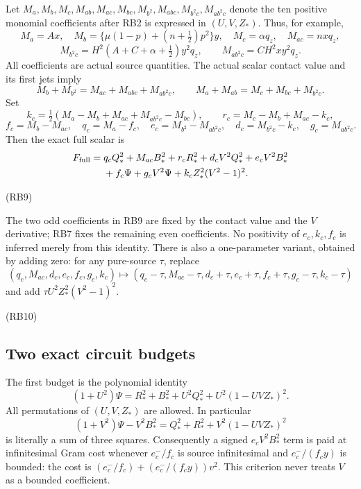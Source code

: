 Let $M_a,M_b,M_c,M_{ab},M_{ac},M_{bc},M_{b^2},
M_{abc},M_{b^2c},M_{ab^2c}$ denote the ten positive monomial
coefficients after RB2 is expressed in $(U,V,Z_*)$. Thus, for example,
\[
 M_a=Ax,\quad M_b=\{\mu(1-p)+(n+\tfrac12)p^2\}y,\quad
 M_c=\alpha q_z,\quad M_{ac}=nxq_z,
\]
\[
 M_{b^2c}=H^2(A+C+\alpha+\tfrac12)y^2q_z,\qquad
 M_{ab^2c}=CH^2xy^2q_z.
\tag{RB6}
\]
All coefficients are actual source quantities.
The actual scalar contact value and its first jets imply
\[
 M_b+M_{b^2}=M_{ac}+M_{abc}+M_{ab^2c},\qquad
 M_a+M_{ab}=M_c+M_{bc}+M_{b^2c}.
\tag{RB7}
\]
Set
\[
 k_c=\tfrac12(M_a-M_b+M_{ac}+M_{ab^2c}-M_{bc}),\qquad
 r_c=M_c-M_b+M_{ac}-k_c,
\]
\[
 f_c=M_b-M_{ac},\quad q_c=M_a-f_c,\quad
 e_c=M_{b^2}-M_{ab^2c},\quad d_c=M_{b^2c}-k_c,\quad
 g_c=M_{ab^2c}.
\tag{RB8}
\]
Then the exact full scalar is
\begin{align*}
F_{\rm full}={}&q_cQ_*^2+M_{ac}B_*^2+r_cR_*^2
 +d_cV^2Q_*^2+e_cV^2B_*^2\\
&+f_c\Psi+g_cV^2\Psi
 +k_cZ_*^2(V^2-1)^2 .
\end{align*}
\par\noindent\hfill\textup{(RB9)}\par
The two odd coefficients in RB9 are fixed by the contact value and
the $V$ derivative; RB7 fixes the remaining even coefficients.
No positivity of $e_c,k_c,f_c$ is inferred merely from this identity.
There is also a one-parameter variant, obtained by adding zero:
for any pure-source $\tau$, replace
\[
 (q_c,M_{ac},d_c,e_c,f_c,g_c,k_c)
 \longmapsto
 (q_c-\tau,M_{ac}-\tau,d_c+\tau,e_c+\tau,
  f_c+\tau,g_c-\tau,k_c-\tau)
\]
and add $\tau U^2Z_*^2(V^2-1)^2$.
\par\noindent\hfill\textup{(RB10)}\par

\subsection{Two exact circuit budgets}

The first budget is the polynomial identity
\[
 (1+U^2)\Psi
 =R_*^2+B_*^2+U^2Q_*^2+U^2(1-UVZ_*)^2.
\tag{RB11}
\]
All permutations of $(U,V,Z_*)$ are allowed. In particular
\[
 (1+V^2)\Psi-V^2B_*^2
       =Q_*^2+R_*^2+V^2(1-UVZ_*)^2
\tag{RB12}
\]
is literally a sum of three squares. Consequently a signed
$e_cV^2B_*^2$ term is paid at infinitesimal Gram cost whenever
$e_c^-/f_c$ is source infinitesimal and
$e_c^-/(f_cy)$ is bounded: the cost is
$(e_c^-/f_c)+(e_c^-/(f_cy))v^2$. This criterion never treats
$V$ as a bounded coefficient.

